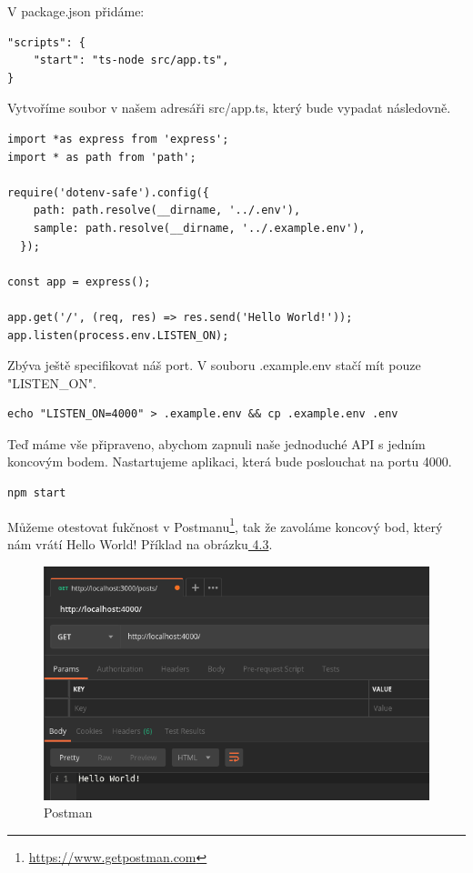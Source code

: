 \documentclass[thesis=B,czech]{FITthesis}[2012/06/26]
\begin{document}
        V package.json přidáme:
        \begin{verbatim}
"scripts": {
    "start": "ts-node src/app.ts",
}
        \end{verbatim}
        Vytvoříme soubor v našem adresáři src/app.ts, který bude vypadat následovně.
        \begin{verbatim}
import *as express from 'express';
import * as path from 'path';

require('dotenv-safe').config({
    path: path.resolve(__dirname, '../.env'),
    sample: path.resolve(__dirname, '../.example.env'),
  });

const app = express();

app.get('/', (req, res) => res.send('Hello World!'));
app.listen(process.env.LISTEN_ON);
        \end{verbatim}
        Zbýva ještě specifikovat náš port. V souboru .example.env stačí mít pouze "LISTEN\_ON".
        \begin{verbatim}
echo "LISTEN_ON=4000" > .example.env && cp .example.env .env
        \end{verbatim}
        Teď máme vše připraveno, abychom zapnuli naše jednoduché API s jedním koncovým bodem. Nastartujeme aplikaci, která bude poslouchat na portu 4000.  
        \begin{verbatim}
npm start
        \end{verbatim}
        Můžeme otestovat fukčnost v Postmanu\footnote{\url{https://www.getpostman.com}}, tak že zavoláme koncový bod, který nám vrátí Hello World! Příklad na obrázku\hyperref[fig:Postman]{ 4.3}.
        \begin{figure}[h!]
            \includegraphics[scale=0.45]{PostmanHelloWorld}
            \caption{Postman}
        \end{figure}
\end{document}
